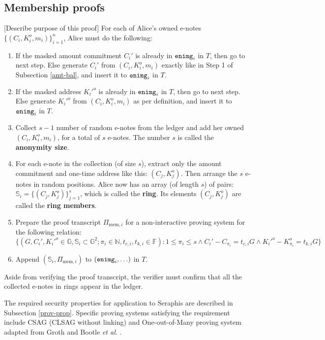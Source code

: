 \documentclass{article}
\theoremstyle{plain}
\theoremstyle{remark}
\begin{document}
\subsection{Membership proofs}\label{mem}
[Describe purpose of this proof] For each of Alice's owned e-notes $\{(C_i,K_i^o,m_i)\}_{i=1}^n$, Alice must do the following:
\begin{enumerate}
    \item If the masked amount commitment $C_i'$ is already in ${\tt enimg}_i$ in $T$, then go to next step. Else generate $C_i'$ from $(C_i, K_i^o, m_i)$ exactly like in Step 1 of Subsection \ref{amt-bal}, and insert it to ${\tt enimg}_i$ in $T$.
    \item If the masked address $K_i'^o$ is already in ${\tt enimg}_i$ in $T$, then go to next step. Else generate $K_i'^o$ from $(C_i, K_i^o, m_i)$ as per definition, and insert it to ${\tt enimg}_i$ in $T$.
    \item Collect $s-1$ number of random e-notes from the ledger and add her owned $(C_i,K_i^o,m_i)$, for a total of $s$ e-notes. The number $s$ is called the \textbf{anonymity size}.
    \item For each e-note in the collection (of size $s$), extract only the amount commitment and one-time address like this: $(C_j, K_j^o)$. Then arrange the $s$ e-notes in random positions. Alice now has an array (of length $s$) of pairs: $\mathbb{S}_i = \{(C_j, K_j^o)\}_{j=1}^s$, which is called the \textbf{ring}. Its elements $(C_j, K_j^o)$ are called the \textbf{ring members}. 
    \item Prepare the proof transcript $\Pi_{\text{mem}, i}$ for a non-interactive proving system for the following relation:
$$\{(G, C_i', K_i'^o \in\mathbb{G}, \mathbb{S}_i\subset\mathbb{G}^2; \pi_i\in\mathbb{N}, t_{c,i}, t_{k,i}\in\mathbb{F}): 1\le\pi_i\le s \wedge C_i' - C_{\pi_i} = t_{c,i} G \wedge K_i'^o - K_{\pi_i}^o = t_{k,i} G \}$$
    \item Append $(\mathbb{S}_i, \Pi_{\text{mem}, i})$ to $({\tt enimg}_i, \ldots)$ in $T$.
\end{enumerate}
Aside from verifying the proof transcript, the verifier must confirm that all the collected e-notes in rings appear in the ledger.

The required security properties for application to Seraphis are described in Subsection \ref{prov-prop}. Specific proving systems satisfying the requirement include CSAG (CLSAG \cite{clsag} without linking) and One-out-of-Many proving system adapted from Groth and Bootle \textit{et al.} \cite{groth, bootle}.
\end{document}

